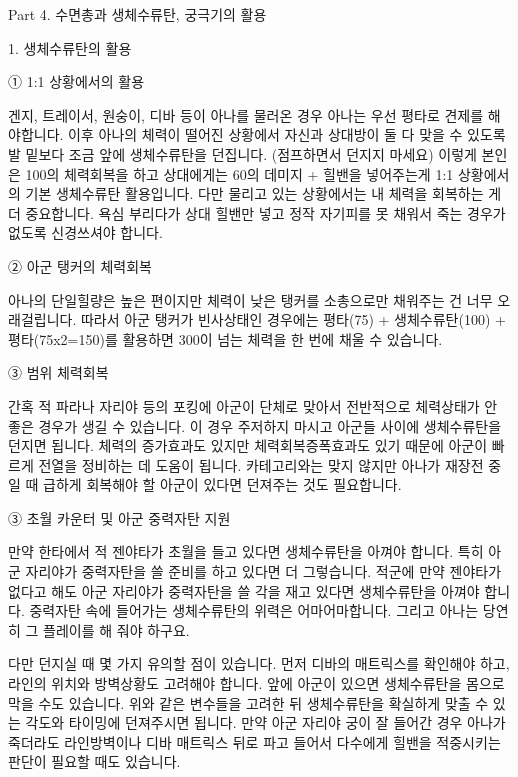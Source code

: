  

 

Part 4. 수면총과 생체수류탄, 궁극기의 활용

 

1. 생체수류탄의 활용

 

① 1:1 상황에서의 활용

겐지, 트레이서, 원숭이, 디바 등이 아나를 물러온 경우 아나는 우선 평타로 견제를 해야합니다. 이후 아나의 체력이 떨어진 상황에서 자신과 상대방이 둘 다 맞을 수 있도록 발 밑보다 조금 앞에 생체수류탄을 던집니다. (점프하면서 던지지 마세요) 이렇게 본인은 100의 체력회복을 하고 상대에게는 60의 데미지 + 힐밴을 넣어주는게 1:1 상황에서의 기본 생체수류탄 활용입니다. 다만 물리고 있는 상황에서는 내 체력을 회복하는 게 더 중요합니다. 욕심 부리다가 상대 힐밴만 넣고 정작 자기피를 못 채워서 죽는 경우가 없도록 신경쓰셔야 합니다.

 

② 아군 탱커의 체력회복

아나의 단일힐량은 높은 편이지만 체력이 낮은 탱커를 소총으로만 채워주는 건 너무 오래걸립니다. 따라서 아군 탱커가 빈사상태인 경우에는 평타(75) + 생체수류탄(100) + 평타(75x2=150)를 활용하면 300이 넘는 체력을 한 번에 채울 수 있습니다.

 

③ 범위 체력회복

간혹 적 파라나 자리야 등의 포킹에 아군이 단체로 맞아서 전반적으로 체력상태가 안 좋은 경우가 생길 수 있습니다. 이 경우 주저하지 마시고 아군들 사이에 생체수류탄을 던지면 됩니다. 체력의 증가효과도 있지만 체력회복증폭효과도 있기 때문에 아군이 빠르게 전열을 정비하는 데 도움이 됩니다. 카테고리와는 맞지 않지만 아나가 재장전 중일 때 급하게 회복해야 할 아군이 있다면 던져주는 것도 필요합니다.

 

③ 초월 카운터 및 아군 중력자탄 지원

만약 한타에서 적 젠야타가 초월을 들고 있다면 생체수류탄을 아껴야 합니다. 특히 아군 자리야가 중력자탄을 쓸 준비를 하고 있다면 더 그렇습니다. 적군에 만약 젠야타가 없다고 해도 아군 자리야가 중력자탄을 쓸 각을 재고 있다면 생체수류탄을 아껴야 합니다. 중력자탄 속에 들어가는 생체수류탄의 위력은 어마어마합니다. 그리고 아나는 당연히 그 플레이를 해 줘야 하구요.

 

다만 던지실 때 몇 가지 유의할 점이 있습니다. 먼저 디바의 매트릭스를 확인해야 하고, 라인의 위치와 방벽상황도 고려해야 합니다. 앞에 아군이 있으면 생체수류탄을 몸으로 막을 수도 있습니다. 위와 같은 변수들을 고려한 뒤 생체수류탄을 확실하게 맞출 수 있는 각도와 타이밍에 던져주시면 됩니다. 만약 아군 자리야 궁이 잘 들어간 경우 아나가 죽더라도 라인방벽이나 디바 매트릭스 뒤로 파고 들어서 다수에게 힐밴을 적중시키는 판단이 필요할 때도 있습니다.

